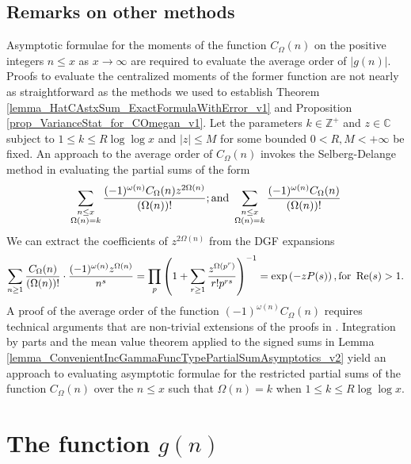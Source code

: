 \documentclass[11pt,reqno,a4letter]{article}
\newcommand{\hlocalref}[1]{\hyperref[#1]{\ref{#1}}}
\numberwithin{equation}{section}
\numberwithin{figure}{section}
\numberwithin{table}{section}
\theoremstyle{plain}
\numberwithin{theorem}{section}
\theoremstyle{definition}
\theoremstyle{remark}
\renewcommand{\Re}{\operatorname{Re}}
\newcommand{\mathtext}[1]{\text{\rm #1}}
\begin{document}
\subsection{Remarks on other methods} 
\label{subSection_RemarksOnAvgOrderFor_COmegan_directly_SelbergDelangeMethod} 

Asymptotic formulae for the moments of the function $C_{\Omega}(n)$ on the 
positive integers $n \leq x$ as $x \rightarrow \infty$ are required 
to evaluate the average order of $|g(n)|$.  
Proofs to evaluate the centralized moments of the former function are not 
nearly as straightforward as the methods we used to establish 
Theorem \hlocalref{lemma_HatCAstxSum_ExactFormulaWithError_v1} and 
Proposition \hlocalref{prop_VarianceStat_for_COmegan_v1}. 
Let the parameters $k \in \mathbb{Z}^{+}$ and $z \in \mathbb{C}$ subject to 
$1 \leq k \leq R \log\log x$ and $|z| \leq M$ for some bounded
$0 < R, M < +\infty$ be fixed. 
An approach to the average order of $C_{\Omega}(n)$ 
invokes the Selberg-Delange method 
\cite[\S II.6.1]{TENENBAUM-PROBNUMT-METHODS} \cite[\S 7.4]{MV} 
in evaluating the partial sums of the form 
\[
\sum_{\substack{n \leq x \\ \Omega(n)=k}} \frac{(-1)^{\omega(n)} 
     C_{\Omega}(n) z^{2\Omega(n)}}{(\Omega(n))!}; \mathtext{ and } 
     \sum_{\substack{n \leq x \\ \Omega(n)=k}} \frac{(-1)^{\omega(n)} 
     C_{\Omega}(n)}{(\Omega(n))!} 
\]
We can extract the coefficients of $z^{2\Omega(n)}$ 
from the DGF expansions  
\[
\sum_{n \geq 1} \frac{C_{\Omega}(n)}{(\Omega(n))!} \cdot 
     \frac{(-1)^{\omega(n)} z^{\Omega(n)}}{n^s} = \prod_p \left(1 + \sum_{r \geq 1} 
     \frac{z^{\Omega(p^r)}}{r! p^{rs}}\right)^{-1} 
     = \exp\left(-z P(s)\right), \mathtext{ for } \Re(s) > 1. 
\]
A proof of the average order of the 
function $(-1)^{\omega(n)} C_{\Omega}(n)$ requires technical arguments 
that are non-trivial extensions of the proofs in 
\cite{MV,TENENBAUM-PROBNUMT-METHODS}. 
Integration by parts and the mean value theorem applied to the 
signed sums in Lemma \hlocalref{lemma_ConvenientIncGammaFuncTypePartialSumAsymptotics_v2} 
yield an approach to evaluating asymptotic formulae for the restricted partial sums of 
the function $C_{\Omega}(n)$ over the $n \leq x$ such that $\Omega(n) = k$ 
when $1 \leq k \leq R \log\log x$. 

\section{The function $g(n)$} 
\label{Section_NewFormulasForgInvn_v2} 
\end{document}
